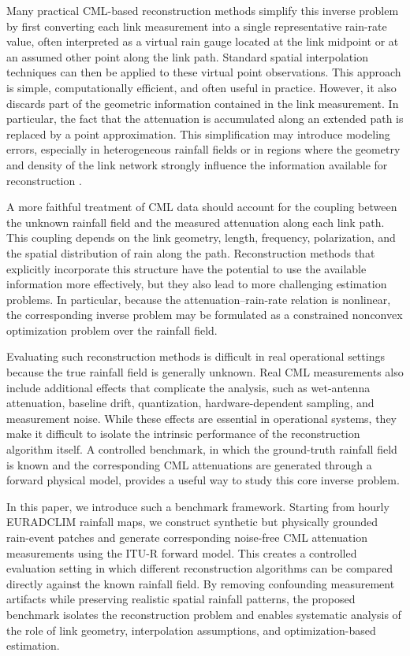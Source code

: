 \documentclass[a4paper,fleqn]{cas-sc}
\begin{document}
Many practical CML-based reconstruction methods simplify this inverse problem by first converting each link measurement into a single representative rain-rate value, often interpreted as a virtual rain gauge located at the link midpoint or at an assumed other point along the link path. Standard spatial interpolation techniques can then be applied to these virtual point observations. This approach is simple, computationally efficient, and often useful in practice. However, it also discards part of the geometric information contained in the link measurement. In particular, the fact that the attenuation is accumulated along an extended path is replaced by a point approximation. This simplification may introduce modeling errors, especially in heterogeneous rainfall fields or in regions where the geometry and density of the link network strongly influence the information available for reconstruction \cite{gat2019comparative,Leijnse2008}. %

A more faithful treatment of CML data should account for the coupling between the unknown rainfall field and the measured attenuation along each link path. This coupling depends on the link geometry, length, frequency, polarization, and the spatial distribution of rain along the path. Reconstruction methods that explicitly incorporate this structure have the potential to use the available information more effectively, but they also lead to more challenging estimation problems. In particular, because the attenuation--rain-rate relation is nonlinear, the corresponding inverse problem may be formulated as a constrained nonconvex optimization problem over the rainfall field.

Evaluating such reconstruction methods is difficult in real operational settings because the true rainfall field is generally unknown. Real CML measurements also include additional effects that complicate the analysis, such as wet-antenna attenuation, baseline drift, quantization, hardware-dependent sampling, and measurement noise. While these effects are essential in operational systems, they make it difficult to isolate the intrinsic performance of the reconstruction algorithm itself. A controlled benchmark, in which the ground-truth rainfall field is known and the corresponding CML attenuations are generated through a forward physical model, provides a useful way to study this core inverse problem.

In this paper, we introduce such a benchmark framework. Starting from hourly EURADCLIM rainfall maps, we construct synthetic but physically grounded rain-event patches and generate corresponding noise-free CML attenuation measurements using the ITU-R forward model. This creates a controlled evaluation setting in which different reconstruction algorithms can be compared directly against the known rainfall field. By removing confounding measurement artifacts while preserving realistic spatial rainfall patterns, the proposed benchmark isolates the reconstruction problem and enables systematic analysis of the role of link geometry, interpolation assumptions, and optimization-based estimation.
\end{document}
